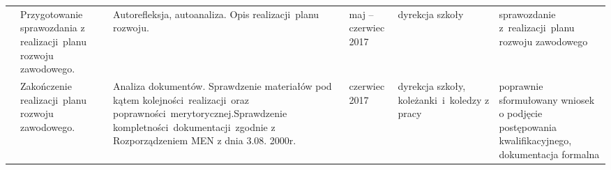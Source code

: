 \documentclass[a4paper,titlepage,13pt,draft]{mwart}
\begin{document}
\begin{tabular}{ | p{2.4cm} | p{2.5cm} | p{5cm} | p{1.4cm} | p{2cm} | p{2.1cm} |}
& Przygotowanie sprawozdania z realizacji~planu rozwoju zawodowego. & Autorefleksja, autoanaliza.\newline
Opis realizacji~planu rozwoju. & maj -- czerwiec 2017 & dyrekcja szkoły & sprawozdanie z~realizacji~planu rozwoju zawodowego \\ \cline{2-6}
& Zakończenie realizacji~planu rozwoju zawodowego. & Analiza dokumentów.\newline
Sprawdzenie materiałów pod kątem kolejności~realizacji~oraz poprawności~merytorycznej.\newline Sprawdzenie kompletności~dokumentacji~zgodnie z Rozporządzeniem MEN z dnia 3.08. 2000r. & czerwiec 2017 & dyrekcja szkoły, koleżanki~i~koledzy z pracy & poprawnie sformułowany wniosek o podjęcie postępowania kwalifikacyjnego, dokumentacja formalna \\ \hline
\end{tabular}
\newpage
\end{document}
